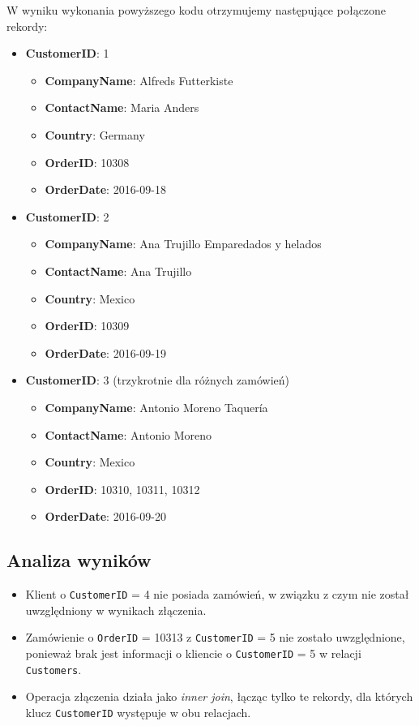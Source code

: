 \documentclass{article}
\begin{document}
W wyniku wykonania powyższego kodu otrzymujemy następujące połączone rekordy:

\begin{itemize}
    \item \textbf{CustomerID}: 1
    \begin{itemize}
        \item \textbf{CompanyName}: Alfreds Futterkiste
        \item \textbf{ContactName}: Maria Anders
        \item \textbf{Country}: Germany
        \item \textbf{OrderID}: 10308
        \item \textbf{OrderDate}: 2016-09-18
    \end{itemize}
    \item \textbf{CustomerID}: 2
    \begin{itemize}
        \item \textbf{CompanyName}: Ana Trujillo Emparedados y helados
        \item \textbf{ContactName}: Ana Trujillo
        \item \textbf{Country}: Mexico
        \item \textbf{OrderID}: 10309
        \item \textbf{OrderDate}: 2016-09-19
    \end{itemize}
    \item \textbf{CustomerID}: 3 (trzykrotnie dla różnych zamówień)
    \begin{itemize}
        \item \textbf{CompanyName}: Antonio Moreno Taquería
        \item \textbf{ContactName}: Antonio Moreno
        \item \textbf{Country}: Mexico
        \item \textbf{OrderID}: 10310, 10311, 10312
        \item \textbf{OrderDate}: 2016-09-20
    \end{itemize}
\end{itemize}

\subsection{Analiza wyników}

\begin{itemize}
    \item Klient o \texttt{CustomerID} = 4 nie posiada zamówień, w związku z czym nie został uwzględniony w wynikach złączenia.
    \item Zamówienie o \texttt{OrderID} = 10313 z \texttt{CustomerID} = 5 nie zostało uwzględnione, ponieważ brak jest informacji o kliencie o \texttt{CustomerID} = 5 w relacji \texttt{Customers}.
    \item Operacja złączenia działa jako \emph{inner join}, łącząc tylko te rekordy, dla których klucz \texttt{CustomerID} występuje w obu relacjach.
\end{itemize}
\end{document}
